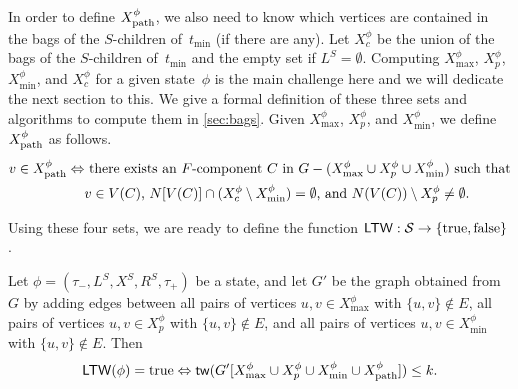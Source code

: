 \documentclass[a4paper,UKenglish,cleveref, autoref, thm-restate, numberwithinsect]{lipics-v2021}
\newcounter{algorithm}
\newcommand{\tw}{\mathsf{tw}}
\newcommand{\ltw}{\mathsf{LTW}}
\newcommand{\dpath}{\textup{path}}
\newcommand{\true}{\textup{true}}
\newcommand{\false}{\textup{false}}
\begin{document}
In order to define $X^\phi_{\dpath}$, we also need to know which vertices are contained in the bags of the $S$-children of~$t_{\min}$ (if there are any). Let $X^\phi_c$ be the union of the bags of the $S$-children of~$t_{\min}$ and the empty set if $L^S=\emptyset$.
Computing $X^\phi_{\max}$, $X^\phi_p$, $X^\phi_{\min}$, and $X^\phi_c$ for a given state~$\phi$ is the main challenge here and we will dedicate the next section to this. 
We give a formal definition of these three sets and algorithms to compute them in \cref{sec:bags}. Given $X^\phi_{\max}$, $X^\phi_p$, and $X^\phi_{\min}$, we define $X^\phi_{\dpath}$ as follows.
\begin{align*}
v\in X^\phi_{\dpath}\Leftrightarrow & \text{ there exists an }F\text{-component } C \text{ in }G-(X^\phi_{\max}\cup X^\phi_p\cup X^\phi_{\min})\text{ such that}\\
& v\in V(C) \text{, } N[V(C)]\cap (X^\phi_c\setminus X^\phi_{\min})=\emptyset \text{, and } N(V(C))\setminus X^\phi_p\neq\emptyset.
\end{align*}


Using these four sets, we are ready to define the function $\ltw:\mathcal{S}\rightarrow \{\true,\false\}$.

\begin{definition}[Local Treewidth $\ltw$]\label{def:ltw}
    Let $\phi=(\tau_-,L^S, X^S, R^S,\tau_+)$ be a state, and let $G'$ be the graph obtained from $G$ by adding edges between all pairs of vertices $u,v\in  X^\phi_{\max}$ with $\{u,v\}\notin E$, all pairs of vertices $u,v\in  X^\phi_p$ with $\{u,v\}\notin E$, and all pairs of vertices $u,v\in X^\phi_{\min}$ with $\{u,v\}\notin E$. Then 
    \[
    \ltw(\phi) = \true \Leftrightarrow  \tw(G'[X^\phi_{\max}\cup X^\phi_p\cup X^\phi_{\min}\cup X^\phi_{\dpath}])\le k.
    \]
\end{definition}
\end{document}
